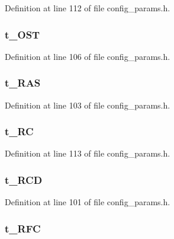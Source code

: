Definition at line 112 of file config\_\-params.h.
\subsubsection[{t\_\-OST}]{ {\bf t\_\-OST}}\label{config__params_8h_635df1de31d54e4cb8777583366f4557}




Definition at line 106 of file config\_\-params.h.
\subsubsection[{t\_\-RAS}]{ {\bf t\_\-RAS}}\label{config__params_8h_922b63d06cf57b48a984342835b4e871}




Definition at line 103 of file config\_\-params.h.
\subsubsection[{t\_\-RC}]{ {\bf t\_\-RC}}\label{config__params_8h_0dca745437819ad187ed4fcac7620fbd}




Definition at line 113 of file config\_\-params.h.
\subsubsection[{t\_\-RCD}]{ {\bf t\_\-RCD}}\label{config__params_8h_6230a7fc83ebdda3c94d2268a38194ed}




Definition at line 101 of file config\_\-params.h.
\subsubsection[{t\_\-RFC}]{ {\bf t\_\-RFC}}\label{config__params_8h_0ff88cb083371f71b3b85123c8fc3f9f}




